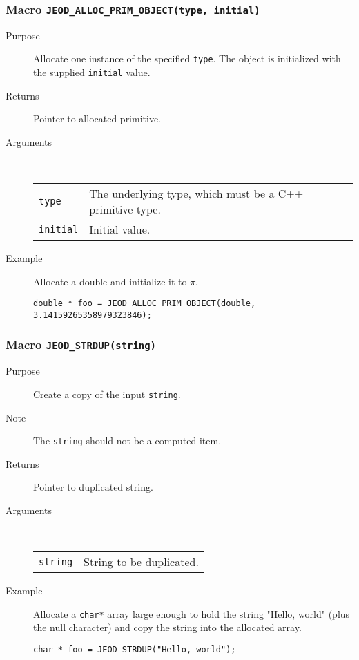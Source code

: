 \subsubsection{Macro {\tt JEOD\_ALLOC\_PRIM\_OBJECT(type, initial)}}
\begin{description}
\item[Purpose]
Allocate one instance of the specified {\tt type}.
The object is initialized with the supplied {\tt initial} value.
\item[Returns] Pointer to allocated primitive.
\item[Arguments] \ \\
\begin{tabular}{@{}ll}
{\tt type} &  The underlying type, which must be a C++ primitive type. \\
{\tt initial} &  Initial value.
\end{tabular}
\item[Example]
Allocate a double and initialize it to $\pi$.
\begin{verbatim}
double * foo = JEOD_ALLOC_PRIM_OBJECT(double, 3.14159265358979323846);
\end{verbatim}
\end{description}

\subsubsection{Macro {\tt JEOD\_STRDUP(string)}}
\begin{description}
\item[Purpose]
Create a copy of the input {\tt string}.
\item[Note] The {\tt string} should not be a computed item.
\item[Returns] Pointer to duplicated string.
\item[Arguments] \ \\
\begin{tabular}{@{}ll}
{\tt string} &  String to be duplicated.
\end{tabular}
\item[Example]
Allocate a \verb|char*| array large enough to hold the
string "Hello, world" (plus the null character) and copy the
string into the allocated array.
\begin{verbatim}
char * foo = JEOD_STRDUP("Hello, world");
\end{verbatim}
\end{description}


